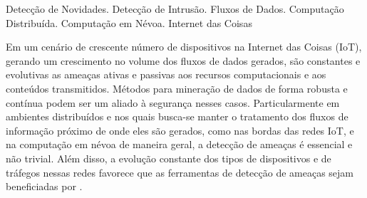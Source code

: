 \begin{resumo}{Detecção de Novidades. Detecção de Intrusão. Fluxos de Dados.
   Computação Distribuída. Computação em Névoa. Internet das Coisas}


   Em um cenário de crescente número de dispositivos na Internet das Coisas
   (IoT), gerando um crescimento  no volume dos fluxos de dados
   gerados,
   são constantes e evolutivas as ameaças ativas e passivas aos recursos
   computacionais e aos conteúdos transmitidos.
   Métodos para mineração de dados de forma robusta e contínua podem ser um
   aliado à segurança nesses casos.
   Particularmente em ambientes distribuídos e nos quais busca-se manter o tratamento
   dos fluxos de informação próximo de onde eles são gerados, como nas bordas das
   redes IoT, e na computação em névoa de maneira geral, a detecção de ameaças é
   essencial e não trivial.
   Além disso, a evolução constante dos tipos de dispositivos e de tráfegos
   nessas redes favorece que as ferramentas de detecção de ameaças sejam
   beneficiadas por .

\end{resumo}
